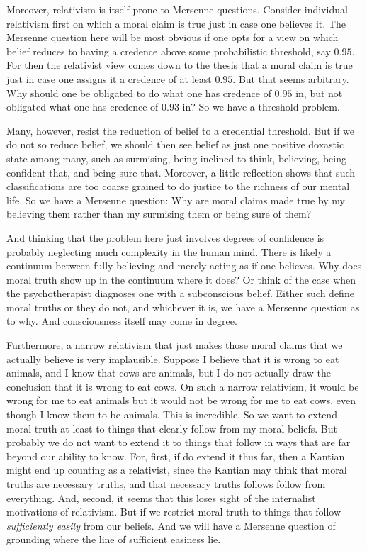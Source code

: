 Moreover, relativism is itself prone to
Mersenne questions. Consider individual relativism first on which a moral claim is true just in case one believes
it. The Mersenne question here will be most obvious if one opts for a view on which belief reduces to having a
credence above some probabilistic threshold, say $0.95$. For then the relativist view comes down to the thesis
that a moral claim is true just in case one assigns it a credence of at least $0.95$. But that seems arbitrary.
Why should one be obligated to do what one has credence of $0.95$ in, but not obligated what one has credence of $0.93$ in?
So we have a threshold problem.

Many, however, resist the reduction of belief to a credential threshold. But if we do not so reduce belief, we should
then see belief as just one positive doxastic state among many, such as surmising, being inclined to think, believing,
being confident that, and being sure that. Moreover, a little reflection shows that
such classifications are too coarse grained to do justice to the richness of our mental life. So we have a Mersenne
question: Why are moral claims made true by my believing them rather than my surmising them or being sure of them?

And thinking that the problem here just involves degrees of confidence is probably neglecting much complexity in the human
mind. There is likely a continuum between fully believing and merely acting as if one believes. Why does moral truth show up
in the continuum where it does? Or think of the case when the psychotherapist diagnoses one with a subconscious belief.
Either such define moral truths or they do not, and whichever it is, we have a Mersenne question as to why. And consciousness
itself may come in degree.

Furthermore, a narrow relativism that just makes those moral claims that we actually believe is very implausible. Suppose I believe that it is wrong
to eat animals, and I know that cows are animals, but I do not actually draw the conclusion that it is wrong to eat cows.
On such a narrow relativism, it would be wrong for me to eat animals but it would not be wrong for me to eat cows, even though
I know them to be animals. This is incredible. So we want to extend moral truth at least to things that clearly follow from my moral beliefs.
But probably we do not want to extend it to things that follow in ways that are far beyond our ability to know. For, first,
if do extend it thus far, then a Kantian might end up counting as a relativist, since the Kantian may think that moral truths are
necessary truths, and that necessary truths follows follow from everything. And, second, it seems that this loses sight of the 
internalist motivations of relativism. But if we restrict moral truth to things that follow \textit{sufficiently easily} from
our beliefs. And we will have a Mersenne question of grounding where the line of sufficient easiness lie.

